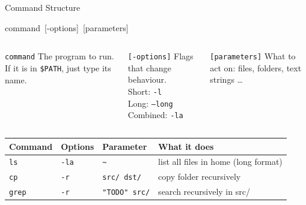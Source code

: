 \documentclass[aspectratio=169]{beamer}
\begin{document}
\begin{frame}{Command Structure}
  \begin{center}
    {\ttfamily\large \alert{command}~[-options]~[parameters]}
  \end{center}
  \vspace{0.4em}
  \begin{columns}
      \begin{block}{\texttt{command}}
        The program to run.
        If it is in \texttt{\$PATH},
        just type its name.
      \end{block}
      \begin{exampleblock}{\texttt{[-options]}}
        Flags that change behaviour.\\[0.2em]
        Short: \texttt{-l}\\
        Long: \texttt{--long}\\
        Combined: \texttt{-la}
      \end{exampleblock}
      \begin{block}{\texttt{[parameters]}}
        What to act on:
        files, folders,
        text strings \ldots
      \end{block}
  \end{columns}
  \vspace{0.4em}
  \begin{table}
    \begin{tabularx}{\textwidth}{lllX}
      \textbf{Command} & \textbf{Options} & \textbf{Parameter}
        & \textbf{What it does} \\
      \toprule
      \texttt{ls}   & \texttt{-la} & \texttt{\textasciitilde}
        & list all files in home (long format) \\
      \texttt{cp}   & \texttt{-r}  & \texttt{src/ dst/}
        & copy folder recursively \\
      \texttt{grep} & \texttt{-r}  & \texttt{"TODO" src/}
        & search recursively in src/ \\
      \bottomrule
    \end{tabularx}
  \end{table}
\end{frame}
\end{document}
